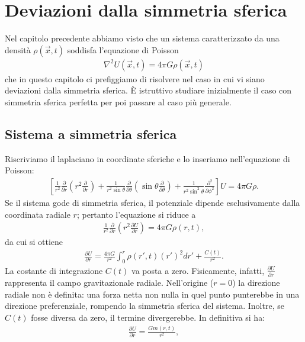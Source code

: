 \chapter{Deviazioni dalla simmetria sferica}

Nel capitolo precedente abbiamo visto che un sistema caratterizzato da una densità $\rho(\vec{x}, t)$ soddisfa l'equazione di Poisson
\begin{align}
	\nabla^2 U(\vec{x}, t) = 4 \pi G \rho(\vec{x}, t)
\end{align}
che in questo capitolo ci prefiggiamo di risolvere nel caso in cui vi siano deviazioni dalla simmetria sferica. È istruttivo studiare inizialmente il caso con simmetria sferica perfetta per poi passare al caso più generale.
\section{Sistema a simmetria sferica}
Riscriviamo il laplaciano in coordinate sferiche e lo inseriamo nell'equazione di Poisson:
\begin{align}
\left[ \frac{1}{r^2} \frac{\partial}{\partial r}\left(r^2 \frac{\partial}{\partial r}\right) + \frac{1}{r^2 \sin{\theta}} \frac{\partial}{\partial \theta}\left(\sin{\theta} \frac{\partial}{\partial \theta}\right) + \frac{1}{r^2 \sin^2{\theta}} \frac{\partial^2}{\partial \phi^2} \right] U = 4 \pi G \rho.
\end{align}
Se il sistema gode di simmetria sferica, il potenziale dipende esclusivamente dalla coordinata radiale $r$; pertanto l'equazione si riduce a
\begin{align}
    \frac{1}{r^2} \frac{\partial}{\partial r} \left( r^2 \frac{\partial U}{\partial r} \right) = 4 \pi G \rho(r, t),
\end{align}
da cui si ottiene
\begin{align}
    \frac{\partial U}{\partial r} = \frac{4 \pi G}{r^2} \int_0^r \rho(r', t) (r')^2 dr' + \frac{C(t)}{r^2}.
\end{align}
La costante di integrazione $C(t)$ va posta a zero. Fisicamente, infatti, $\frac{\partial U}{\partial r}$ rappresenta il campo gravitazionale radiale. Nell'origine ($r=0$) la direzione radiale non è definita: una forza netta non nulla in quel punto punterebbe in una direzione preferenziale, rompendo la simmetria sferica del sistema. Inoltre, se $C(t)$ fosse diversa da zero, il termine divergerebbe. In definitiva si ha:
\begin{align}
    \frac{\partial U}{\partial r} = \frac{G m(r, t)}{r^2},
\end{align}
